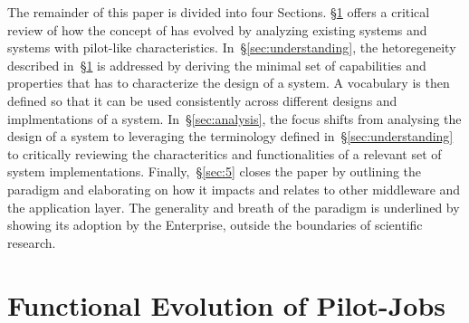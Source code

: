 \documentclass{sig-alternate}
\begin{document}

The remainder of this paper is divided into four Sections. \S\ref{sec:history}
offers a critical review of how the concept of \pilotjobs has evolved by
analyzing existing \pilot systems and systems with pilot-like characteristics.
In~\S\ref{sec:understanding}, the hetoregeneity described
in~\S\ref{sec:history} is addressed by deriving the minimal set of capabilities
and properties that has to characterize the design of a \pilot system. A
vocabulary is then defined so that it can be used consistently across different
designs and implmentations of a \pilot system. In~\S\ref{sec:analysis}, the
focus shifts from analysing the design of a \pilot system to  leveraging the
terminology defined in~\S\ref{sec:understanding} to critically reviewing the
characteritics and functionalities of a relevant set of \pilot system
implementations. Finally,~\S\ref{sec:5} closes the paper by outlining the
\pilot paradigm and elaborating on how it impacts and relates to other
middleware and the application layer. The generality and breath of the
\pilot paradigm is underlined by showing its adoption by the
Enterprise, outside the boundaries of scientific research.

%
\section{Functional Evolution of Pilot-Jobs}
\label{sec:history}



\end{document}
